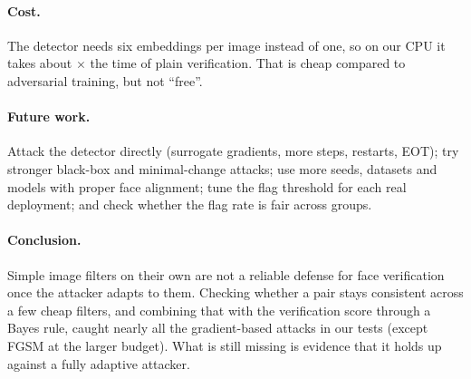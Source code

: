 \paragraph{Cost.} The detector needs six embeddings per image instead of one, so on our CPU it takes about \mscratio$\times$ the time of plain verification. That is cheap compared to adversarial training, but not ``free''.

\paragraph{Future work.} Attack the detector directly (surrogate gradients, more steps, restarts, EOT); try stronger black-box and minimal-change attacks; use more seeds, datasets and models with proper face alignment; tune the flag threshold for each real deployment; and check whether the flag rate is fair across groups.

\paragraph{Conclusion.} Simple image filters on their own are not a reliable defense for face verification once the attacker adapts to them. Checking whether a pair stays consistent across a few cheap filters, and combining that with the verification score through a Bayes rule, caught nearly all the gradient-based attacks in our tests (except FGSM at the larger budget). What is still missing is evidence that it holds up against a fully adaptive attacker.
